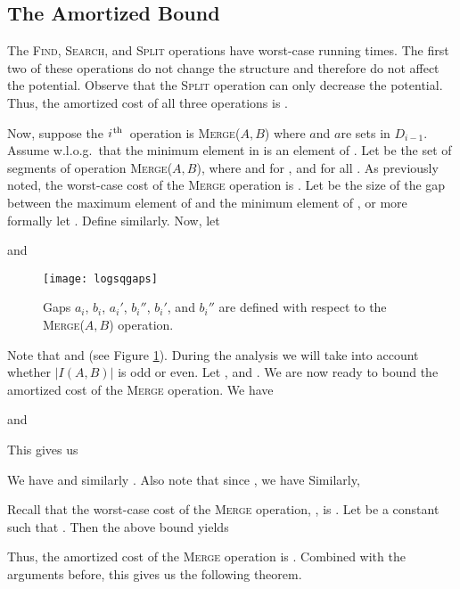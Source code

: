 \documentclass[11pt]{article}
\newcommand{\ens}[1]{\ensuremath{#1}}
\newcommand{\ith}{\ens{i^{\mbox{\hspace{.2mm}\scriptsize th}}}}
\newcommand{\kwMs}{Make-Set}
\newcommand{\kwSpl}{Split}
\newcommand{\kwUnion}{Merge}
\newcommand{\kwSrc}{Search}
\newcommand{\kwFind}{Find}
\newcommand{\Ms}{\mbox{\textsc{\kwMs}}}
\newcommand{\Spl}{\mbox{\textsc{\kwSpl}}}
\newcommand{\Union}{\mbox{\textsc{\kwUnion{}}}}
\newcommand{\Unionx}[2]{\mbox{\textsc{\kwUnion(\ensuremath{#1,#2})}}}
\newcommand{\Src}{\mbox{\textsc{\kwSrc}}}
\newcommand{\Find}{\mbox{\textsc{\kwFind}}}
\newcommand{\opcountmonetext}{three}
\newcommand{\opcountmtwotext}{two}
\newcommand{\segments}{{\segment}s}
\newcommand{\segment}{segment}
\newcommand{\intnum}[2]{\ensuremath{|I(\set{#1},\set{#2})|}}
\newcommand{\set}[1]{\ensuremath{#1}}
\newcommand{\agap}[1]{\ensuremath{a_{#1}}}
\newcommand{\leftofa}[1]{\ensuremath{a_{#1}'}}
\newcommand{\bgap}[1]{\ensuremath{b_{#1}}}
\newcommand{\leftofb}[1]{\ensuremath{b_{#1}'}}
\newcommand{\rightofb}[1]{\ensuremath{b_{#1}''}}
\newcommand{\datast}[1]{\ensuremath{D_{#1}}}
\newcommand{\hide}[1]{}
\newcounter{count}
\begin{document}
\subsection{The Amortized  Bound} 
\label{subsec:LogSQBound} 

The \hide{\Ms{}, }\Find{}, \Src{}, and \Spl{} operations have worst-case  running times. The first \opcountmtwotext{} of these operations do not change the structure and therefore do not affect the potential. Observe that the \Spl{} operation can only decrease the potential. Thus, the amortized cost of all \opcountmonetext{} operations is . 

Now, suppose the \ith\ operation is \Unionx{A}{B} where \set  and \set  are sets in \datast{i-1}. Assume w.l.o.g.~that the minimum element in  is an element of \set . Let  be the set of \segments{} of operation \Unionx{A}{B}, where  and  for , and  for all . 
As previously noted, the worst-case cost of the \Union{} operation is . Let  be the size of the gap between the maximum element of  and the minimum element of , or more formally let . Define  similarly. Now, let 
 
 
 
and 
 
 
 
\begin{figure}
\centering 
\texttt{[image: logsqgaps]} 
\caption{Gaps \agap i, \bgap i, \leftofa i, \rightofb i, \leftofb i, and \rightofb i are defined with respect to the \Unionx{A}{B} operation.} 
\label{fig:lgsqgaps} 
\end{figure} 
 
Note that  and  (see Figure \ref{fig:lgsqgaps}). During the analysis we will take into account whether \intnum{A}{B} is odd or even. Let , and . We are now ready to bound the amortized cost of the \Union{} operation. We have 
 
 
 

 
and 
 
This gives us 
{\allowdisplaybreaks 
 
We have  and similarly . Also note that since , we have  Similarly,  
} 


Recall that the worst-case cost of the \Union{} operation, , is . Let  be a constant such that . Then the above bound yields 
 


Thus, the amortized cost of the \Union{} operation is . Combined with the arguments before, this gives us the following theorem. 
 
\end{document}
